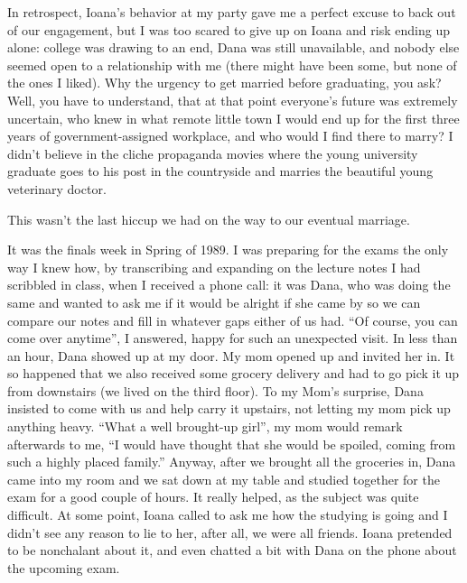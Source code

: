 \documentclass[12pt]{book}
\begin{document}
In retrospect, Ioana's behavior at my party gave me a perfect excuse to
back out of our engagement, but I was too scared to give up on Ioana and
risk ending up alone: college was drawing to an end, Dana was still
unavailable, and nobody else seemed open to a relationship with me
(there might have been some, but none of the ones I liked). Why the
urgency to get married before graduating, you ask? Well, you have to
understand, that at that point everyone's future was extremely
uncertain, who knew in what remote little town I would end up for the
first three years of government-assigned workplace, and who would I find
there to marry? I didn't believe in the cliche propaganda movies where
the young university graduate goes to his post in the countryside and
marries the beautiful young veterinary doctor.

This wasn't the last hiccup we had on the way to our eventual marriage.

It was the finals week in Spring of 1989. I was preparing for the exams
the only way I knew how, by transcribing and expanding on the lecture
notes I had scribbled in class, when I received a phone call: it was
Dana, who was doing the same and wanted to ask me if it would be alright
if she came by so we can compare our notes and fill in whatever gaps
either of us had. ``Of course, you can come over anytime'', I answered,
happy for such an unexpected visit. In less than an hour, Dana showed up
at my door. My mom opened up and invited her in. It so happened that we
also received some grocery delivery and had to go pick it up from
downstairs (we lived on the third floor). To my Mom's surprise, Dana
insisted to come with us and help carry it upstairs, not letting my mom
pick up anything heavy. ``What a well brought-up girl'', my mom would
remark afterwards to me, ``I would have thought that she would be
spoiled, coming from such a highly placed family.'' Anyway, after we
brought all the groceries in, Dana came into my room and we sat down at
my table and studied together for the exam for a good couple of hours.
It really helped, as the subject was quite difficult. At some point,
Ioana called to ask me how the studying is going and I didn't see any
reason to lie to her, after all, we were all friends. Ioana pretended to
be nonchalant about it, and even chatted a bit with Dana on the phone
about the upcoming exam.
\end{document}
